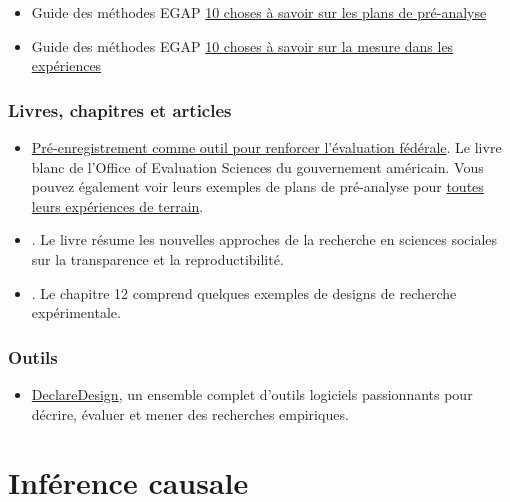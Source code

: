 \documentclass[12pt,]{book}
\providecommand{\tightlist}{%
  \setlength{\itemsep}{0pt}\setlength{\parskip}{0pt}}
\begin{document}
\begin{itemize}
\item
  Guide des méthodes EGAP \href{https://egap.org/resource/10-things-to-know-about-pre-analysis-plans/}{10 choses à savoir sur les plans de pré-analyse}
\item
  Guide des méthodes EGAP \href{https://egap.org/resource/10-things-to-know-about-measurement-in-experiments/}{10 choses à savoir sur la mesure dans les expériences}
\end{itemize}

\hypertarget{livres-chapitres-et-articles}{%
\subsection{Livres, chapitres et articles}\label{livres-chapitres-et-articles}}

\begin{itemize}
\item
  \href{https://oes.gsa.gov/assets/files/preregistration-as-a-tool-in-federal-evaluation.pdf}{Pré-enregistrement comme outil pour renforcer l'évaluation fédérale}. Le livre blanc de l'Office of Evaluation Sciences du gouvernement américain. Vous pouvez également voir leurs exemples de plans de pré-analyse pour \href{https://oes.gsa.gov/work/}{toutes leurs expériences de terrain}.
\item
  \autocite{christensen_transparent_2019}. Le livre résume les nouvelles approches de la recherche en sciences sociales sur la transparence et la reproductibilité.
\item
  \autocite{gerber_field_2012}. Le chapitre 12 comprend quelques exemples de designs de recherche expérimentale.
\end{itemize}

\hypertarget{outils}{%
\subsection{Outils}\label{outils}}

\begin{itemize}
\tightlist
\item
  \href{https://declaredesign.org/}{DeclareDesign}, un ensemble complet d'outils logiciels passionnants pour décrire, évaluer et mener des recherches empiriques.
\end{itemize}

\hypertarget{infuxe9rence-causale}{%
\chapter{Inférence causale}\label{infuxe9rence-causale}}
\end{document}
